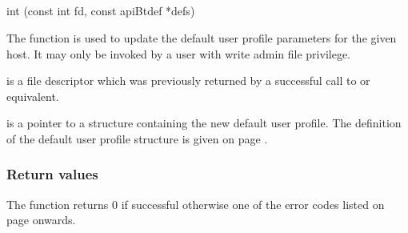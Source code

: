 \subsection{\funcnameXBputbtd{}}

\begin{expara}

int \funcnameXBputbtd{}(const int fd, const apiBtdef *defs)

\end{expara}

The function \funcXBputbtd{} is used to update the
default user profile parameters for the given host. It may only be
invoked by a user with write admin file privilege.

 is a file descriptor which was previously
returned by a successful call to \funcXBopen{} or equivalent.

 is a pointer to a structure containing the
new default user profile. The definition of the default user profile
structure is given on page \pageref{bkm:Defaultuser}.

\subsubsection{Return values}
The function returns 0 if successful otherwise one of the error codes
listed on page \pageref{errorcodes} onwards.

